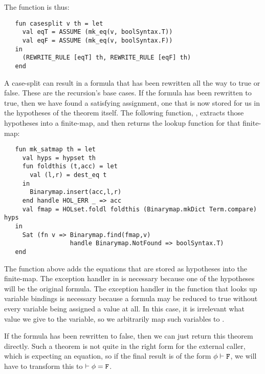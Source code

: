 The  function is thus:
\begin{hol}
\begin{verbatim}
   fun casesplit v th = let
     val eqT = ASSUME (mk_eq(v, boolSyntax.T))
     val eqF = ASSUME (mk_eq(v, boolSyntax.F))
   in
     (REWRITE_RULE [eqT] th, REWRITE_RULE [eqF] th)
   end
\end{verbatim}
\end{hol}

A case-split can result in a formula that has been rewritten all the
way to true or false.  These are the recursion's base cases. If the
formula has been rewritten to true, then we have found a satisfying
assignment, one that is now stored for us in the hypotheses of the
theorem itself.  The following function, , extracts
those hypotheses into a finite-map, and then returns the lookup
function for that finite-map:
\begin{hol}
\begin{verbatim}
   fun mk_satmap th = let
     val hyps = hypset th
     fun foldthis (t,acc) = let
       val (l,r) = dest_eq t
     in
       Binarymap.insert(acc,l,r)
     end handle HOL_ERR _ => acc
     val fmap = HOLset.foldl foldthis (Binarymap.mkDict Term.compare) hyps
   in
     Sat (fn v => Binarymap.find(fmap,v)
                  handle Binarymap.NotFound => boolSyntax.T)
   end
\end{verbatim}
\end{hol}
The  function above adds the equations that are stored as
hypotheses into the finite-map.  The exception handler in
 is necessary because one of the hypotheses will be the
original formula.  The exception handler in the function that looks up
variable bindings is necessary because a formula may be reduced to
true without every variable being assigned a value at all.  In this
case, it is irrelevant what value we give to the variable, so we
arbitrarily map such variables to .

If the formula has been rewritten to false, then we can just return
this theorem directly.  Such a theorem is not quite in the right form
for the external caller, which is expecting an equation, so if the
final result is of the form $\phi\vdash \holtxt{F}$, we will have to
transform this to $\vdash \phi = \holtxt{F}$.

